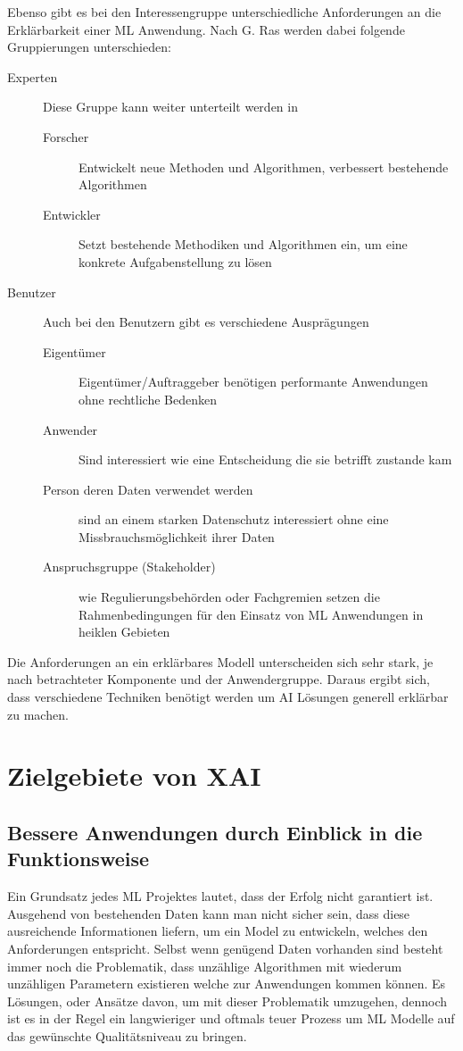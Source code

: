 \documentclass[
  12pt, %
  a4paper, %
  oneside, %
  openany, 
  numbers=noenddot, %
  BCOR=5mm, %
  parskip=half*, %
  thesis, %
]{bfhbook}
\begin{document}
Ebenso gibt es bei den Interessengruppe unterschiedliche Anforderungen an die Erklärbarkeit einer ML Anwendung. Nach G. Ras \parencite{Ras2018} werden dabei folgende Gruppierungen unterschieden:
\begin{description}
  \item[Experten]
  Diese Gruppe kann weiter unterteilt werden in
  	\begin{description}
  		\item[Forscher] Entwickelt neue Methoden und Algorithmen, verbessert bestehende Algorithmen
  		\item[Entwickler] Setzt bestehende Methodiken und Algorithmen ein, um eine konkrete Aufgabenstellung zu lösen
	\end{description}
  \item[Benutzer]
  Auch bei den Benutzern gibt es verschiedene Ausprägungen
  	\begin{description}
  		\item[Eigentümer] Eigentümer/Auftraggeber benötigen performante Anwendungen ohne rechtliche Bedenken
  		\item[Anwender] Sind interessiert wie eine Entscheidung die sie betrifft zustande kam
  		\item[Person deren Daten verwendet werden] sind an einem starken Datenschutz interessiert ohne eine Missbrauchsmöglichkeit ihrer Daten
  		\item[Anspruchsgruppe (Stakeholder)] wie Regulierungsbehörden oder Fachgremien setzen die Rahmenbedingungen für den Einsatz von \Gls{ML} Anwendungen in heiklen Gebieten
	\end{description}
\end{description}
Die Anforderungen an ein erklärbares Modell unterscheiden sich sehr stark, je nach betrachteter Komponente und der Anwendergruppe. Daraus ergibt sich, dass verschiedene Techniken benötigt werden um AI Lösungen generell erklärbar zu machen.

\section{Zielgebiete von XAI}

\subsection{Bessere Anwendungen durch Einblick in die Funktionsweise}
Ein Grundsatz jedes \Gls{ML} Projektes lautet, dass der Erfolg nicht garantiert ist. Ausgehend von bestehenden Daten kann man nicht sicher sein, dass diese ausreichende Informationen liefern, um ein Model zu entwickeln, welches den Anforderungen entspricht. Selbst wenn genügend Daten vorhanden sind besteht immer noch die Problematik, dass unzählige Algorithmen mit wiederum unzähligen Parametern existieren welche zur Anwendungen kommen können. Es Lösungen, oder Ansätze davon, um mit dieser Problematik umzugehen, dennoch ist es in der Regel ein langwieriger und oftmals teuer Prozess um \Gls{ML} Modelle auf das gewünschte Qualitätsniveau zu bringen.
\end{document}

